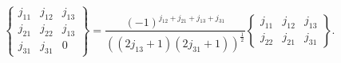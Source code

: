 \[\begin{Bmatrix}j_{11}&j_{12}&j_{13}\\
j_{21}&j_{22}&j_{13}\\
j_{31}&j_{31}&0\end{Bmatrix}=\frac{(-1)^{j_{12}+j_{21}+j_{13}+j_{31}}}{((2j_{1%
3}+1)(2j_{31}+1))^{\frac{1}{2}}}\begin{Bmatrix}j_{11}&j_{12}&j_{13}\\
j_{22}&j_{21}&j_{31}\end{Bmatrix}.\]